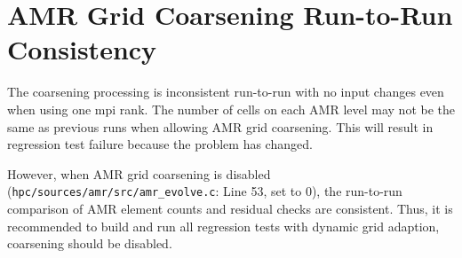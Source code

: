 \documentclass[11pt]{book}
\begin{document}
\section{AMR Grid Coarsening Run-to-Run Consistency}
The coarsening processing is inconsistent run-to-run with no input changes even when using one mpi rank.
The number of cells on each AMR level may not be the same as previous runs when allowing AMR grid coarsening.
This will result in regression test failure because the problem has changed.

However, when AMR grid coarsening is disabled (\texttt{hpc/sources/amr/src/amr\_evolve.c}: Line 53, set to 0),
the run-to-run comparison of AMR element counts and residual checks are consistent. Thus, it is recommended to 
build and run all regression tests with dynamic grid adaption, coarsening should be disabled.
\end{document}
